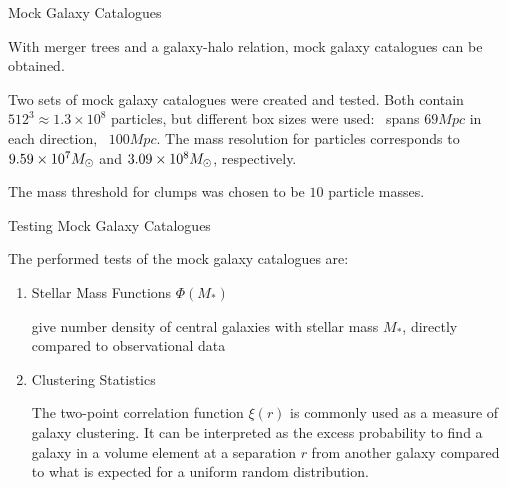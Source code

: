 \begin{frame}{Mock Galaxy Catalogues}
    
    With merger trees and a galaxy-halo relation, mock galaxy catalogues can be obtained.
    
    Two sets of mock galaxy catalogues were created and tested.
    Both contain $512^3 \approx 1.3 \times 10^8$ particles, but different box sizes were used: \gsmall\ spans $69 Mpc$ in each direction, \glarge\ $100Mpc$.
    The mass resolution for particles corresponds to $9.59\times 10^7 M_\odot$ and $3.09 \times 10^8M_\odot$, respectively.
    
    The mass threshold for clumps was chosen to be $10$ particle masses.
    
\end{frame}



\begin{frame}{Testing Mock Galaxy Catalogues}
    
    The performed tests of the mock galaxy catalogues are:
    
    \begin{enumerate}
        \item Stellar Mass Functions $\Phi(M_*)$
        
        give number density of central galaxies with stellar mass $M_*$, directly compared to observational data
        
        \item Clustering Statistics
        
        The two-point correlation function $\xi(r)$ is commonly used as a measure of galaxy clustering.
        It can be interpreted as the excess probability to find a galaxy in a volume element at a separation $r$ from another galaxy compared to what is expected for a uniform random distribution.
    \end{enumerate}
    
\end{frame}



